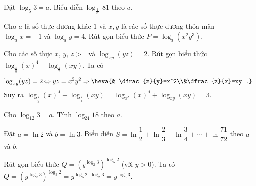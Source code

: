 \begin{bt}
	Đặt $\log _5 3=a$. Biểu diễn $\log _{\tfrac{1}{25}} 81$ theo $a$.
\end{bt}
\begin{bt}
	Cho $a$ là số thực dương khác $1$ và $x,y$ là các số thực dương thỏa mãn ${{\log }_a}x=-1$ và ${{\log }_a}y=4$. Rút gọn biểu thức $P={{\log }_a}( {x^2}{y^3} )$.
\end{bt}
\begin{bt}
	Cho các số thực $ x,\, y ,\, z >1$ và $ \log_{xy}(yz)=2 $. Rút gọn biểu thức $\log_{\frac{z}{y}}\left(x\right)^4 +\log_{\frac{z}{x}}(xy)$.
	\loigiai
	{
		Ta có \[ \log_{xy}(yz)=2\Leftrightarrow yz=x^2y^2\Rightarrow \heva{& \dfrac{z}{y}=x^2\\&\dfrac{z}{x}=xy .}\]
		Suy ra $ \log_{\frac{z}{y}}\left(x\right) ^4 +\log_{\frac{z}{x}}(xy)=\log_{x^2} (x)^4+\log_{xy}(xy)=3$.
	}
\end{bt}
\begin{bt}
	Cho $\log_{12}3=a$. Tính $\log_{24}18$ theo $a$.
\end{bt}
\begin{bt}
	Đặt $a=\ln 2$ và $b=\ln 3$. Biểu diễn $S=\ln \dfrac{1}{2}+\ln \dfrac{2}{3}+\ln \dfrac{3}{4}+\cdots+\ln \dfrac{71}{72}$ theo $a$ và $b$.
\end{bt}
\begin{bt}
	Rút gọn biểu thức $Q=\left(y^{\log_2 3}\right)^{\log_5 2}$ (với $y>0$).
	\loigiai
	{
		Ta có $Q=\left(y^{\log_2 3}\right)^{\log_5 2}=y^{\log_5 2\cdot\log_2 3}=y^{\log_5 3}$.
	}
\end{bt}
